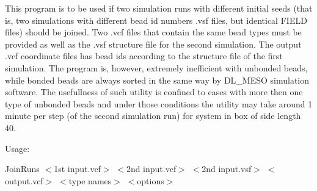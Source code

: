 This program is to be used if two simulation runs with different initial seeds (that is, two simulations with different bead id numbers {\ttfamily .vsf} files, but identical {\ttfamily F\+I\+E\+LD} files) should be joined. Two {\ttfamily .vcf} files that contain the same bead types must be provided as well as the {\ttfamily .vsf} structure file for the second simulation. The output {\ttfamily .vcf} coordinate files has bead ids according to the structure file of the first simulation. The program is, however, extremely inefficient with unbonded beads, while bonded beads are always sorted in the same way by D\+L\+\_\+\+M\+E\+SO simulation software. The usefullness of such utility is confined to cases with more then one type of unbonded beads and under those conditions the utility may take around 1 minute per step (of the second simulation run) for system in box of side length 40.

Usage\+:

{\ttfamily Join\+Runs $<$1st input.\+vcf$>$ $<$2nd input.\+vcf$>$ $<$2nd input.\+vsf$>$ $<$output.\+vcf$>$ $<$type names$>$ $<$options$>$}

